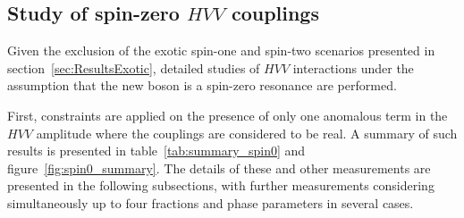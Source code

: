 \subsection{Study of spin-zero $HVV$ couplings} \label{sec:ResultsSpinZero}
Given the exclusion of the exotic spin-one and spin-two scenarios presented in section~\ref{sec:ResultsExotic},
detailed studies of $HVV$ interactions under the assumption that the new boson is a spin-zero
resonance are performed. 

First, constraints are applied on the presence of only one anomalous term in the $HVV$
amplitude where the couplings are considered to be real. A summary of such results is presented
in table~\ref{tab:summary_spin0} and figure~\ref{fig:spin0_summary}.
The details of these and other measurements are presented in the following subsections, with further
measurements considering simultaneously up to four fractions and phase parameters in several cases.

